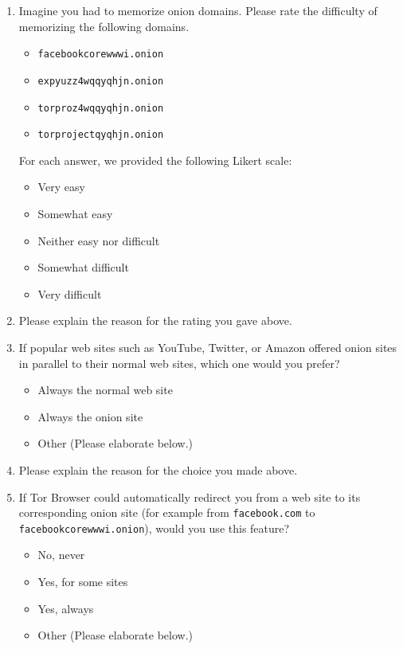 \begin{enumerate}
    \item Imagine you had to memorize onion domains. Please rate the difficulty
        of memorizing the following domains.
        \label{q3_15}
        \begin{itemize}
            \item \texttt{facebookcorewwwi.onion}
            \item \texttt{expyuzz4wqqyqhjn.onion}
            \item \texttt{torproz4wqqyqhjn.onion}
            \item \texttt{torprojectqyqhjn.onion}
        \end{itemize}
        For each answer, we provided the following Likert scale:
        \begin{itemize}
            \item Very easy
            \item Somewhat easy
            \item Neither easy nor difficult
            \item Somewhat difficult
            \item Very difficult
        \end{itemize}

    \item Please explain the reason for the rating you gave above.

    \item If popular web sites such as YouTube, Twitter, or Amazon offered
        onion sites in parallel to their normal web sites, which one would you
        prefer?
        \label{q3_17}
        \begin{itemize}[label=$\Circle$]
            \item Always the normal web site
            \item Always the onion site
            \item Other (Please elaborate below.)
        \end{itemize}

    \item Please explain the reason for the choice you made above.

    \item If Tor Browser could automatically redirect you from a web site to
        its corresponding onion site (for example from \texttt{facebook.com} to
        \texttt{facebookcorewwwi.onion}), would you use this feature?
        \begin{itemize}[label=$\Circle$]
            \item No, never
            \item Yes, for some sites
            \item Yes, always
            \item Other (Please elaborate below.)
        \end{itemize}


\end{enumerate}
